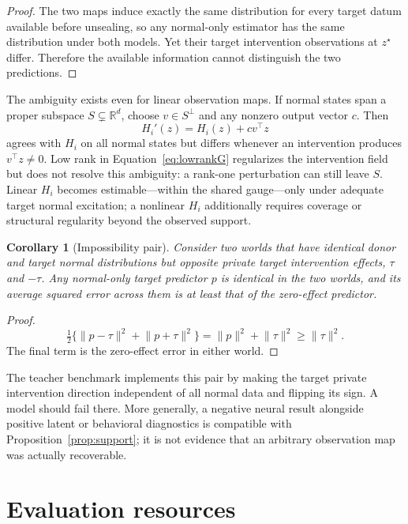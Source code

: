 \documentclass[11pt]{article}
\newtheorem{corollary}{Corollary}
\newcommand{\R}{\mathbb{R}}
\begin{document}
\begin{proof}
The two maps induce exactly the same distribution for every target datum
available before unsealing, so any normal-only estimator has the same
distribution under both models. Yet their target intervention observations at
\(z^\star\) differ. Therefore the available information cannot distinguish
the two predictions.
\end{proof}

The ambiguity exists even for linear observation maps. If normal states span a
proper subspace \(S\subsetneq\R^d\), choose \(v\in S^\perp\) and any nonzero
output vector \(c\). Then
\[
  H_i'(z)=H_i(z)+cv^\top z
\]
agrees with \(H_i\) on all normal states but differs whenever an intervention
produces \(v^\top z\neq0\). Low rank in Equation~\ref{eq:lowrankG}
regularizes the intervention field but does not resolve this ambiguity: a
rank-one perturbation can still leave \(S\). Linear \(H_i\) becomes
estimable---within the shared gauge---only under adequate target normal
excitation; a nonlinear \(H_i\) additionally requires coverage or structural
regularity beyond the observed support.

\begin{corollary}[Impossibility pair]
\label{cor:impossibility}
Consider two worlds that have identical donor and target normal distributions
but opposite private target intervention effects, \(\tau\) and \(-\tau\). Any
normal-only target predictor \(p\) is identical in the two worlds, and its
average squared error across them is at least that of the zero-effect
predictor.
\end{corollary}

\begin{proof}
\[
  \tfrac12\{\lVert p-\tau\rVert^2+\lVert p+\tau\rVert^2\}
  =\lVert p\rVert^2+\lVert\tau\rVert^2
  \geq \lVert\tau\rVert^2.
\]
The final term is the zero-effect error in either world.
\end{proof}

The teacher benchmark implements this pair by making the target private
intervention direction independent of all normal data and flipping its sign.
A model should fail there. More generally, a negative neural result alongside
positive latent or behavioral diagnostics is compatible with
Proposition~\ref{prop:support}; it is not evidence that an
arbitrary observation map was actually recoverable.

\section{Evaluation resources}
\label{sec:data}
\end{document}
